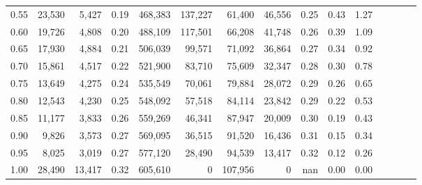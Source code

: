\begin{tabular}{rrrcrrrrrrrrrrr}
0.55 &  23,530 &   5,427 &                                       0.19 &  468,383 &  137,227 &   61,400 &   46,556 &  0.25 &  0.43 &                         1.27 \\
0.60 &  19,726 &   4,808 &                                       0.20 &  488,109 &  117,501 &   66,208 &   41,748 &  0.26 &  0.39 &                         1.09 \\
0.65 &  17,930 &   4,884 &                                       0.21 &  506,039 &   99,571 &   71,092 &   36,864 &  0.27 &  0.34 &                         0.92 \\
0.70 &  15,861 &   4,517 &                                       0.22 &  521,900 &   83,710 &   75,609 &   32,347 &  0.28 &  0.30 &                         0.78 \\
0.75 &  13,649 &   4,275 &                                       0.24 &  535,549 &   70,061 &   79,884 &   28,072 &  0.29 &  0.26 &                         0.65 \\
0.80 &  12,543 &   4,230 &                                       0.25 &  548,092 &   57,518 &   84,114 &   23,842 &  0.29 &  0.22 &                         0.53 \\
0.85 &  11,177 &   3,833 &                                       0.26 &  559,269 &   46,341 &   87,947 &   20,009 &  0.30 &  0.19 &                         0.43 \\
0.90 &   9,826 &   3,573 &                                       0.27 &  569,095 &   36,515 &   91,520 &   16,436 &  0.31 &  0.15 &                         0.34 \\
0.95 &   8,025 &   3,019 &                                       0.27 &  577,120 &   28,490 &   94,539 &   13,417 &  0.32 &  0.12 &                         0.26 \\
1.00 &  28,490 &  13,417 &                                       0.32 &  605,610 &        0 &  107,956 &        0 &   nan &  0.00 &                         0.00 \\
\bottomrule
\end{tabular}
